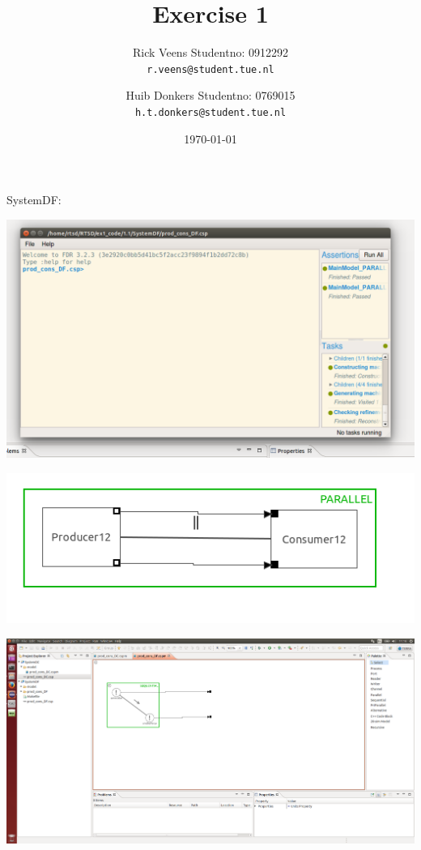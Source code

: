 \documentclass[a4paper,twoside,11pt]{article}
\title{\vspace{-\baselineskip}\sffamily\bfseries Exercise 1}
\author{
	Rick Veens \qquad Studentno: 0912292\\
	\texttt{r.veens@student.tue.nl}
	\and
	Huib Donkers \qquad Studentno: 0769015\\
	\texttt{h.t.donkers@student.tue.nl}
}
\date{\today}
\begin{document}
\maketitle

\section{}
\subsection{}
\subsubsection{}
SystemDF:\\
	\centerline{\includegraphics[width=\linewidth]{./images/1_1-SystemDF.png}}
	\centerline{\includegraphics[width=\linewidth]{./images/1_1-SystemDF_main.png}}
	\centerline{\includegraphics[width=\linewidth]{./images/1_1-SystemDF_cons.png}}
\end{document}
